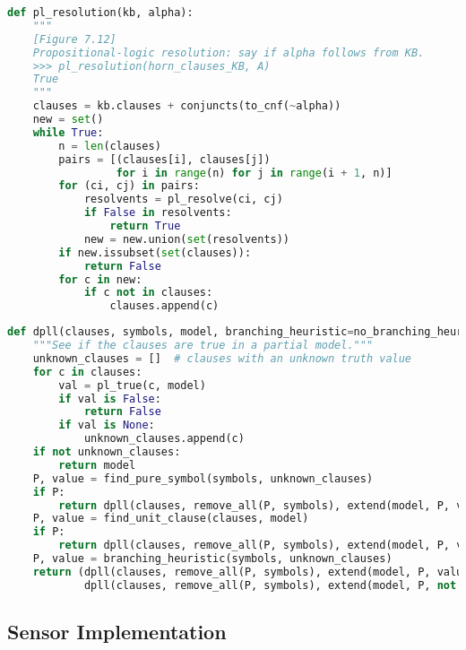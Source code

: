 \newpage

\begin{lstlisting}[language=Python, caption=Resolution Algorithm.]
def pl_resolution(kb, alpha):
    """
    [Figure 7.12]
    Propositional-logic resolution: say if alpha follows from KB.
    >>> pl_resolution(horn_clauses_KB, A)
    True
    """
    clauses = kb.clauses + conjuncts(to_cnf(~alpha))
    new = set()
    while True:
        n = len(clauses)
        pairs = [(clauses[i], clauses[j])
                 for i in range(n) for j in range(i + 1, n)]
        for (ci, cj) in pairs:
            resolvents = pl_resolve(ci, cj)
            if False in resolvents:
                return True
            new = new.union(set(resolvents))
        if new.issubset(set(clauses)):
            return False
        for c in new:
            if c not in clauses:
                clauses.append(c)
\end{lstlisting}
\label{listing:resolution}


\begin{lstlisting}[language=Python, caption=DPLL Algorithm,]
def dpll(clauses, symbols, model, branching_heuristic=no_branching_heuristic):
    """See if the clauses are true in a partial model."""
    unknown_clauses = []  # clauses with an unknown truth value
    for c in clauses:
        val = pl_true(c, model)
        if val is False:
            return False
        if val is None:
            unknown_clauses.append(c)
    if not unknown_clauses:
        return model
    P, value = find_pure_symbol(symbols, unknown_clauses)
    if P:
        return dpll(clauses, remove_all(P, symbols), extend(model, P, value), branching_heuristic)
    P, value = find_unit_clause(clauses, model)
    if P:
        return dpll(clauses, remove_all(P, symbols), extend(model, P, value), branching_heuristic)
    P, value = branching_heuristic(symbols, unknown_clauses)
    return (dpll(clauses, remove_all(P, symbols), extend(model, P, value), branching_heuristic) or
            dpll(clauses, remove_all(P, symbols), extend(model, P, not value), branching_heuristic))

\end{lstlisting}
\label{listing:DPLL}


\subsection*{Sensor Implementation}


